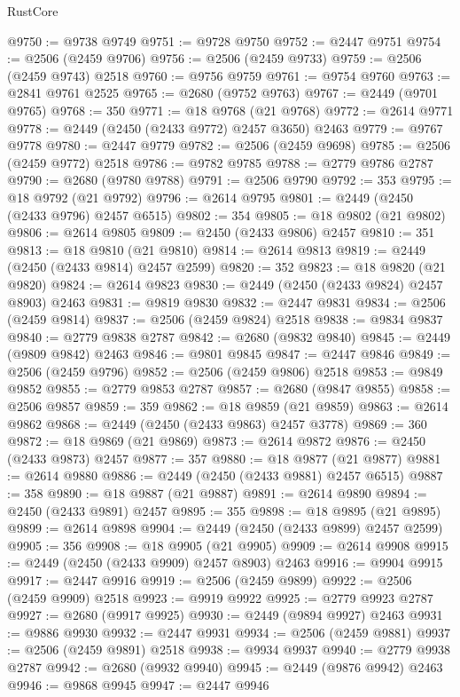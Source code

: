 \begin{lexlean}{RustCore}
\begin{coremodule}
@9750 := @9738 @9749
@9751 := @9728 @9750
@9752 := @2447 @9751
@9754 := @2506 (@2459 @9706)
@9756 := @2506 (@2459 @9733)
@9759 := @2506 (@2459 @9743) @2518
@9760 := @9756 @9759
@9761 := @9754 @9760
@9763 := @2841 @9761 @2525
@9765 := @2680 (@9752 @9763)
@9767 := @2449 (@9701 @9765)
@9768 := 350
@9771 := @18 @9768 (@21 @9768)
@9772 := @2614 @9771
@9778 := @2449 (@2450 (@2433 @9772) @2457 @3650) @2463
@9779 := @9767 @9778
@9780 := @2447 @9779
@9782 := @2506 (@2459 @9698)
@9785 := @2506 (@2459 @9772) @2518
@9786 := @9782 @9785
@9788 := @2779 @9786 @2787
@9790 := @2680 (@9780 @9788)
@9791 := @2506 @9790
@9792 := 353
@9795 := @18 @9792 (@21 @9792)
@9796 := @2614 @9795
@9801 := @2449 (@2450 (@2433 @9796) @2457 @6515)
@9802 := 354
@9805 := @18 @9802 (@21 @9802)
@9806 := @2614 @9805
@9809 := @2450 (@2433 @9806) @2457
@9810 := 351
@9813 := @18 @9810 (@21 @9810)
@9814 := @2614 @9813
@9819 := @2449 (@2450 (@2433 @9814) @2457 @2599)
@9820 := 352
@9823 := @18 @9820 (@21 @9820)
@9824 := @2614 @9823
@9830 := @2449 (@2450 (@2433 @9824) @2457 @8903) @2463
@9831 := @9819 @9830
@9832 := @2447 @9831
@9834 := @2506 (@2459 @9814)
@9837 := @2506 (@2459 @9824) @2518
@9838 := @9834 @9837
@9840 := @2779 @9838 @2787
@9842 := @2680 (@9832 @9840)
@9845 := @2449 (@9809 @9842) @2463
@9846 := @9801 @9845
@9847 := @2447 @9846
@9849 := @2506 (@2459 @9796)
@9852 := @2506 (@2459 @9806) @2518
@9853 := @9849 @9852
@9855 := @2779 @9853 @2787
@9857 := @2680 (@9847 @9855)
@9858 := @2506 @9857
@9859 := 359
@9862 := @18 @9859 (@21 @9859)
@9863 := @2614 @9862
@9868 := @2449 (@2450 (@2433 @9863) @2457 @3778)
@9869 := 360
@9872 := @18 @9869 (@21 @9869)
@9873 := @2614 @9872
@9876 := @2450 (@2433 @9873) @2457
@9877 := 357
@9880 := @18 @9877 (@21 @9877)
@9881 := @2614 @9880
@9886 := @2449 (@2450 (@2433 @9881) @2457 @6515)
@9887 := 358
@9890 := @18 @9887 (@21 @9887)
@9891 := @2614 @9890
@9894 := @2450 (@2433 @9891) @2457
@9895 := 355
@9898 := @18 @9895 (@21 @9895)
@9899 := @2614 @9898
@9904 := @2449 (@2450 (@2433 @9899) @2457 @2599)
@9905 := 356
@9908 := @18 @9905 (@21 @9905)
@9909 := @2614 @9908
@9915 := @2449 (@2450 (@2433 @9909) @2457 @8903) @2463
@9916 := @9904 @9915
@9917 := @2447 @9916
@9919 := @2506 (@2459 @9899)
@9922 := @2506 (@2459 @9909) @2518
@9923 := @9919 @9922
@9925 := @2779 @9923 @2787
@9927 := @2680 (@9917 @9925)
@9930 := @2449 (@9894 @9927) @2463
@9931 := @9886 @9930
@9932 := @2447 @9931
@9934 := @2506 (@2459 @9881)
@9937 := @2506 (@2459 @9891) @2518
@9938 := @9934 @9937
@9940 := @2779 @9938 @2787
@9942 := @2680 (@9932 @9940)
@9945 := @2449 (@9876 @9942) @2463
@9946 := @9868 @9945
@9947 := @2447 @9946

\end{coremodule}
\end{lexlean}
